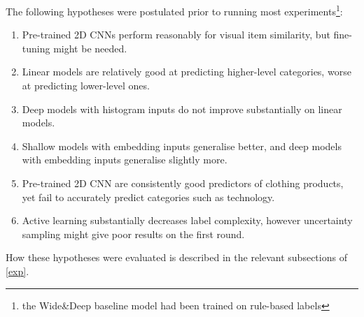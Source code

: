 The following hypotheses were postulated prior to running most experiments\footnote{the Wide\&Deep baseline model had been trained on rule-based labels}:

\begin{enumerate}
  \item Pre-trained 2D CNNs perform reasonably for visual item similarity, but fine-tuning might be needed.
  \item Linear models are relatively good at predicting higher-level categories, worse at predicting lower-level ones.
  \item Deep models with histogram inputs do not improve substantially on linear models.
  \item Shallow models with embedding inputs generalise better, and deep models with embedding inputs generalise slightly more.
  \item Pre-trained 2D CNN are consistently good predictors  of clothing products, yet fail to accurately predict categories such as technology.

  \item Active learning substantially decreases label complexity, however uncertainty sampling might give poor results on the first round.
\end{enumerate}

\hfill \break
How these hypotheses were evaluated is described in the relevant subsections of \ref{exp}.


